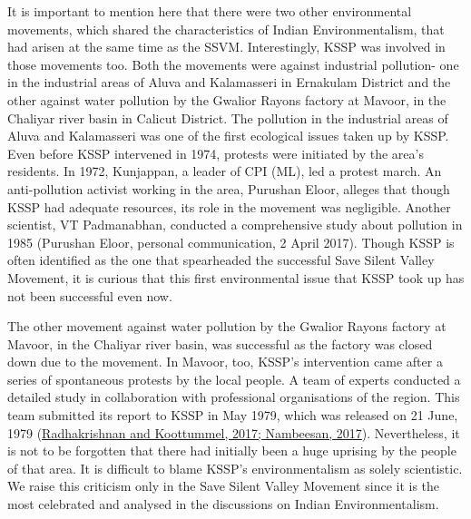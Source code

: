 \documentclass[twoside, 13pt]{article}
\begin{document}
{{\fontsize{12}{14}\selectfont
It is important to mention here that there were two other environmental movements, which shared the characteristics of Indian Environmentalism, that had arisen at the same time as the SSVM. Interestingly, KSSP was involved in those movements too. Both the movements were against industrial pollution- one in the industrial areas of Aluva and Kalamasseri in Ernakulam District and the other against water pollution by the Gwalior Rayons factory at Mavoor, in the Chaliyar river basin in Calicut District. The pollution in the industrial areas of Aluva and Kalamasseri was one of the first ecological issues taken up by KSSP. Even before KSSP intervened in 1974, protests were initiated by the area’s residents. In 1972, Kunjappan, a leader of CPI (ML), led a protest march. An anti-pollution activist working in the area, Purushan Eloor, alleges that though KSSP had adequate resources, its role in the movement was negligible. Another scientist, VT Padmanabhan, conducted a comprehensive study about pollution in 1985 (Purushan Eloor, personal communication, 2 April 2017). Though KSSP is often identified as the one that spearheaded the successful Save Silent Valley Movement, it is curious that this first environmental issue that KSSP took up has not been successful even now.

The other movement against water pollution by the Gwalior Rayons factory at Mavoor, in the Chaliyar river basin, was successful as the factory was closed down due to the movement. In Mavoor, too, KSSP’s intervention came after a series of spontaneous protests by the local people. A team of experts conducted a detailed study in collaboration with professional organisations of the region. This team submitted its report to KSSP in May 1979, which was released on 21 June, 1979 (\underline{Radhakrishnan and Koottummel, 2017; Nambeesan, 2017}). Nevertheless, it is not to be forgotten that there had initially been a huge uprising by the people of that area. It is difficult to blame KSSP’s environmentalism as solely scientistic. We raise this criticism only in the Save Silent Valley Movement since it is the most celebrated and analysed in the discussions on Indian Environmentalism. }

}
\end{document}
